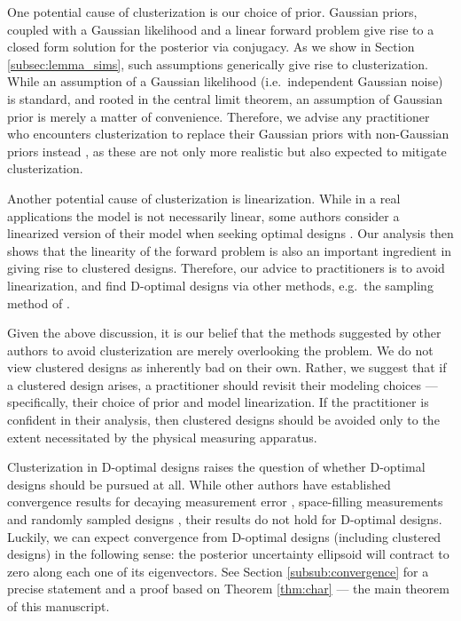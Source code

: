 One potential cause of clusterization is our choice of prior. Gaussian
priors, coupled with a Gaussian likelihood and a linear forward
problem give rise to a closed form solution for the posterior via
conjugacy. As we show in Section \ref{subsec:lemma_sims}, such
assumptions generically give rise to clusterization. While an
assumption of a Gaussian likelihood (i.e.~independent Gaussian noise)
is standard, and rooted in the central limit theorem, an assumption of
Gaussian prior is merely a matter of convenience. Therefore, we advise
any practitioner who encounters clusterization to replace their
Gaussian priors with non-Gaussian priors instead \citet{hosseini2017,
  hosseini2019}, as these are not only more realistic but also
expected to mitigate clusterization.

Another potential cause of clusterization is linearization. While in a
real applications the model is not necessarily linear, some authors
consider a linearized version of their model when seeking optimal
designs \citet{fedorov1996, neitzel2019sparse}. Our analysis then shows
that the linearity of the forward problem is also an important
ingredient in giving rise to clustered designs. Therefore, our advice
to practitioners is to avoid linearization, and find D-optimal designs
via other methods, e.g.~the sampling method of \citet{ryan2003}.

Given the above discussion, it is our belief that the methods
suggested by other authors to avoid clusterization are merely
overlooking the problem. We do not view clustered designs as
inherently bad on their own. Rather, we suggest that if a clustered
design arises, a practitioner should revisit their modeling choices
--- specifically, their choice of prior and model linearization. If
the practitioner is confident in their analysis, then clustered
designs should be avoided only to the extent necessitated by the
physical measuring apparatus.

Clusterization in D-optimal designs raises the question of whether
D-optimal designs should be pursued at all. While other authors have
established convergence results for decaying measurement error
\citet{knapik2011}, space-filling measurements \citet{teckentrup2020}
and randomly sampled designs \citet{nickl2023}, their results do not
hold for D-optimal designs. Luckily, we can expect convergence from
D-optimal designs (including clustered designs) in the following
sense: the posterior uncertainty ellipsoid will contract to zero along
each one of its eigenvectors. See Section \ref{subsub:convergence} for
a precise statement and a proof based on Theorem \ref{thm:char} ---
the main theorem of this manuscript.


